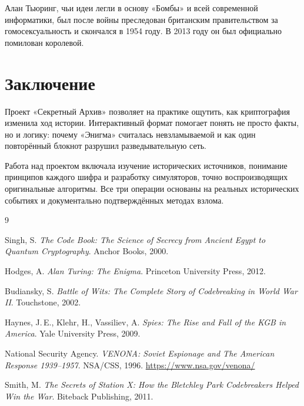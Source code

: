 \documentclass[12pt, a4paper]{article}
\begin{document}
Алан Тьюринг, чьи идеи легли в основу «Бомбы» и всей современной информатики,
был после войны преследован британским правительством за гомосексуальность и
скончался в 1954 году. В 2013 году он был официально помилован королевой.

\section{Заключение}

Проект «Секретный Архив» позволяет на практике ощутить, как криптография
изменила ход истории. Интерактивный формат помогает понять не просто факты, но
и логику: почему «Энигма» считалась невзламываемой и как один повторённый
блокнот разрушил разведывательную сеть.

Работа над проектом включала изучение исторических источников, понимание
принципов каждого шифра и разработку симуляторов, точно воспроизводящих
оригинальные алгоритмы. Все три операции основаны на реальных исторических
событиях и документально подтверждённых методах взлома.

\bigskip
\begin{thebibliography}{9}

Singh, S. \textit{The Code Book: The Science of Secrecy from Ancient Egypt to
Quantum Cryptography}. Anchor Books, 2000.

Hodges, A. \textit{Alan Turing: The Enigma}. Princeton University Press, 2012.

Budiansky, S. \textit{Battle of Wits: The Complete Story of Codebreaking in
World War II}. Touchstone, 2002.

Haynes, J.\,E., Klehr, H., Vassiliev, A. \textit{Spies: The Rise and Fall of
the KGB in America}. Yale University Press, 2009.

National Security Agency. \textit{VENONA: Soviet Espionage and The American
Response 1939--1957}. NSA/CSS, 1996. \url{https://www.nsa.gov/venona/}

Smith, M. \textit{The Secrets of Station X: How the Bletchley Park Codebreakers
Helped Win the War}. Biteback Publishing, 2011.

\end{thebibliography}
\end{document}
